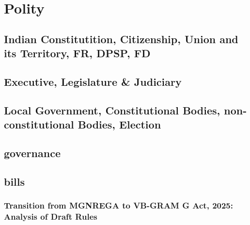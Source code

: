 \chapter{Polity}
\section{Indian Constitutition, Citizenship, Union and its Territory, FR, DPSP, FD}
\section{Executive, Legislature \& Judiciary}
\section{Local Government, Constitutional Bodies, non-constitutional Bodies, Election}
\section{governance}
\section{bills}

\subsection{Transition from MGNREGA to VB-GRAM G Act, 2025: Analysis of Draft Rules}

